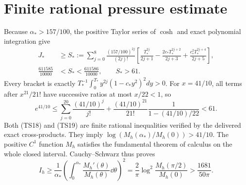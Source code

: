 \section{Finite rational pressure estimate}
Because $\alpha_*>157/100$, the positive Taylor series of $\cosh$
and exact polynomial integration give
\begin{equation}\tag{TS18}\begin{aligned}
 J_*&\geq S_*:=\sum_{j=0}^8\frac{(157/100)^{2j}}{(2j)!}
 \left[\frac{T_*^{2j}}{2j+1}-\frac{2c_*T_*^{2j+2}}{2j+3}
                +\frac{c_*^2T_*^{2j+4}}{2j+5}\right],\\
 \frac{611585}{10000}&<S_*<\frac{611586}{10000},\qquad S_*>61.
\end{aligned}\end{equation}
Every bracket is exactly
$T_*^{-1}\int_0^{T_*}y^{2j}(1-c_*y^2)^2dy>0$.
For $x=41/10$, all terms after $x^{21}/21!$ have successive
ratios at most $x/22<1$, so
\begin{equation}\tag{TS19}
 e^{41/10}\leq\sum_{j=0}^{20}\frac{(41/10)^j}{j!}
 +\frac{(41/10)^{21}}{21!}\frac1{1-(41/10)/22}<61.
\end{equation}
Both (TS18) and (TS19) are finite rational inequalities verified
by the delivered exact cross-products. They imply
$\log(M_h(\alpha_*)/M_h(0))>41/10$. The positive $C^1$ function
$M_h$ satisfies the fundamental theorem of calculus on the whole
closed interval. Cauchy--Schwarz thus proves
\begin{equation}\tag{TS20}
 I_h\geq\frac1{\alpha_*}
 \left(\int_0^{\alpha_*}\frac{M_h'(\theta)}{M_h(\theta)}\dd\theta\right)^2
 =\frac2\pi\log^2\frac{M_h(\pi/2)}{M_h(0)}
 >\frac{1681}{50\pi}.
\end{equation}

